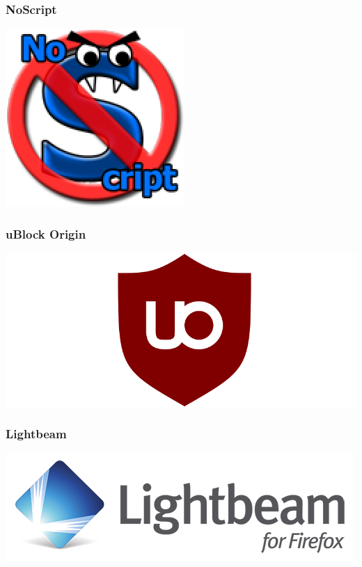   \begin{frame}
    \frametitle{NoScript}
    \includegraphics[height=0.7\textheight]{img/noscript.png}
  \end{frame}

  \begin{frame}
    \frametitle{uBlock Origin}
    \includegraphics[height=0.7\textheight]{img/ublock-edge-extension.png}    
  \end{frame}
  
  \begin{frame}
    \frametitle{Lightbeam}
    \includegraphics[height=0.7\textheight]{img/lightbeam.png}  
  \end{frame}
